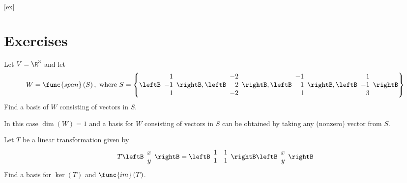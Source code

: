 [ex]
\section*{Exercises}

\begin{enumialphparenastyle}

\begin{ex}
Let $V=\R^{3}$ and let 
\begin{equation*}
W=\func{span} \left( S \right),  \mbox{ where } S=\left\{ \leftB 
\begin{array}{r}
1 \\ 
-1 \\ 
1
\end{array}
\rightB ,\leftB 
\begin{array}{r}
-2 \\ 
2 \\ 
-2
\end{array}
\rightB,\leftB 
\begin{array}{r}
-1 \\ 
1 \\ 
1
\end{array}
\rightB,\leftB 
\begin{array}{r}
1 \\ 
-1 \\ 
3
\end{array}
\rightB \right\}
\end{equation*}
Find a basis of $W$ consisting of vectors in $S$. 

\begin{sol}
In this case $\dim (W)=1$ and a basis for $W$ consisting of vectors in $S$ can be obtained by taking any (nonzero) vector from $S$. 
\end{sol}
\end{ex}


\begin{ex}
 Let $T$ be a linear transformation given by 
\[
T \leftB \begin{array}{r}
x\\
y
\end{array}\rightB = \leftB \begin{array}{rrr}
1 &1  \\
1 & 1
\end{array}\rightB
\leftB \begin{array}{r}
x\\
y
\end{array}\rightB
\]
Find a basis for $\ker \left( T\right)$ and $\func{im} \left( T\right) $.


\end{ex}
\end{enumialphparenastyle}
